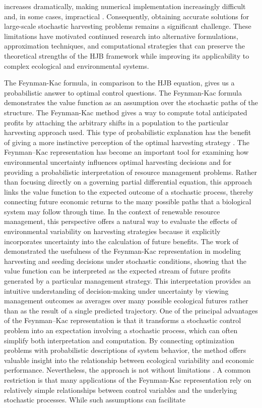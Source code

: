 \documentclass[11pt]{article}
\begin{document}
increases dramatically, making numerical implementation increasingly difficult and, in some cases, impractical \citep{imai2010identification,pramanik2025construction,pramanik2025optimal}. Consequently, obtaining accurate solutions for large-scale stochastic harvesting problems remains a significant challenge. These limitations have motivated continued research into alternative formulations, approximation techniques, and computational strategies that can preserve the theoretical strengths of the HJB framework while improving its applicability to complex ecological and environmental systems.
	
	The Feynman-Kac formula, in comparison to the HJB equation, gives us a probabilistic answer to optimal control questions. The Feynman-Kac formula demonstrates the value function as an assumption over the stochastic paths of the structure. The Feynman-Kac method gives a way to compute total anticipated profits by attaching the arbitrary shifts in a population to the particular harvesting approach used. This type of probabilistic explanation has the benefit of giving a more instinctive perception of the optimal harvesting strategy \citep{pramanik2024stochastic,pramanik2025stubbornness}. The Feynman--Kac representation has become an important tool for examining how environmental uncertainty influences optimal harvesting decisions and for providing a probabilistic interpretation of resource management problems. Rather than focusing directly on a governing partial differential equation, this approach links the value function to the expected outcome of a stochastic process, thereby connecting future economic returns to the many possible paths that a biological system may follow through time. In the context of renewable resource management, this perspective offers a natural way to evaluate the effects of environmental variability on harvesting strategies because it explicitly incorporates uncertainty into the calculation of future benefits. The work of \cite{hening_tran_2020} demonstrated the usefulness of the Feynman-Kac representation in modeling harvesting and seeding decisions under stochastic conditions, showing that the value function can be interpreted as the expected stream of future profits generated by a particular management strategy. This interpretation provides an intuitive understanding of decision-making under uncertainty by viewing management outcomes as averages over many possible ecological futures rather than as the result of a single predicted trajectory. One of the principal advantages of the Feynman--Kac representation is that it transforms a stochastic control problem into an expectation involving a stochastic process, which can often simplify both interpretation and computation. By connecting optimization problems with probabilistic descriptions of system behavior, the method offers valuable insight into the relationship between ecological variability and economic performance. Nevertheless, the approach is not without limitations \citep{pramanik2025dissecting,pramanik2025factors}. A common restriction is that many applications of the Feynman-Kac representation rely on relatively simple relationships between control variables and the underlying stochastic processes. While such assumptions can facilitate 
\end{document}
